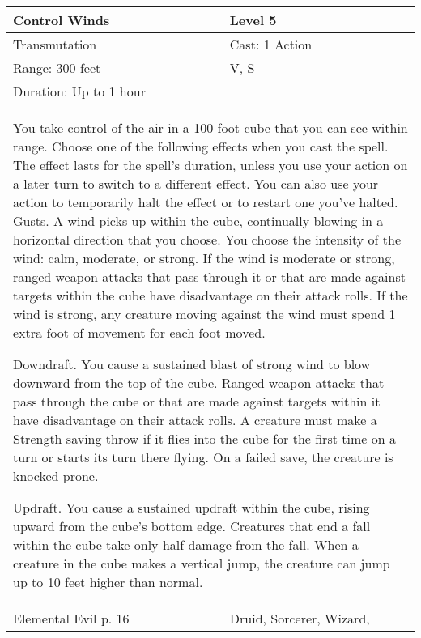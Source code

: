 \documentclass[11pt]{report}
\begin{document}
\begin{table}[H]
	\begin{tabular}{||p{6cm}|p{6cm}||}
		\hline\hline
		\bf{Control Winds} & Level 5\\ \hline
		Transmutation & Cast: 1 Action\\ \hline
		Range: 300 feet & V, S\\ \hline
		Duration: Up to 1 hour & \\ \hline
		\multicolumn{2}{||p{12cm}||}{You take control of the air in a 100-foot cube that you can see within range. Choose one of the following effects when you cast the spell. The effect lasts for the spell’s duration, unless you use your action on a later turn to switch to a different effect. You can also use your action to temporarily halt the effect or to restart one you’ve halted.
Gusts. A wind picks up within the cube, continually blowing in a horizontal direction that you choose. You choose the intensity of the wind: calm, moderate, or strong. If the wind is moderate or strong, ranged weapon attacks that pass through it or that are made against targets within the cube have disadvantage on their attack rolls. If the wind is strong, any creature moving against the wind must spend 1 extra foot of movement for each foot moved.

Downdraft. You cause a sustained blast of strong wind to blow downward from the top of the cube. Ranged weapon attacks that pass through the cube
or that are made against targets within it have disadvantage on their attack rolls. A creature must make a Strength saving throw if it flies into the cube for the first time on a turn or starts its turn there flying. On a failed save, the creature is knocked prone.

Updraft. You cause a sustained updraft within the cube, rising upward from the cube’s bottom edge. Creatures that end a fall within the cube take only half damage from the fall. When a creature in the cube makes a vertical jump, the creature can jump up to 10 feet higher than normal.}\\ \hline
Elemental Evil p. 16 & Druid, Sorcerer, Wizard, \\ \hline\hline
	\end{tabular}
\end{table}
\end{document}
